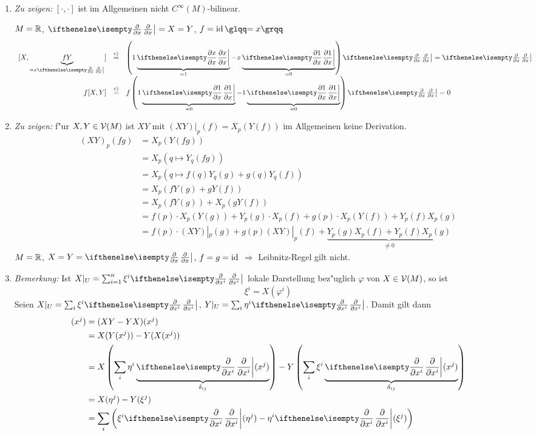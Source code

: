 \begin{Loes}\begin{enumerate}[label=\alph*),leftmargin=*,widest=a]
\item
	\emph{Zu zeigen:} $[\cdot,\cdot]$ ist im Allgemeinen nicht $C^{\infty}(M)$-bilinear.
	
	$M = \operatorname{\mathbb{R}}$, $\pdifffrac{}{x} = X = Y$, $f = \Id \quot{= x}$
		\[\begin{array}{rcl} [X,\underbrace{fY}_{=x \pdifffrac{}{x}}] &\overset{\text{c)}}{=}& \left( 1 \underbrace{\pdifffrac{x}{x}}_{=1} - x \underbrace{\pdifffrac{1}{x}}_{=0} \right) \pdifffrac{}{x} = \pdifffrac{}{x} \\
			f[X,Y] &\overset{\text{c)}}{=}& f \left( 1 \underbrace{\pdifffrac{1}{x}}_{=0} - 1 \underbrace{\pdifffrac{1}{x}}_{=0} \right) \pdifffrac{}{x} = 0 \end{array}\]
\item
	\emph{Zu zeigen:} f"ur $X, Y \in \operatorname{\mathcal{V}}(M)$ ist $XY$ mit $(XY)|_p(f) = X_p(Y(f))$ im Allgemeinen keine Derivation.
	\begin{align*}
		(XY)_p(fg) &= X_p(Y(fg))\\
		&= X_p(q \mapsto Y_q(fg))\\
		&= X_p(q \mapsto f(q) Y_q(g) + g(q) Y_q(f))\\
		&= X_p(fY(g) + gY(f))\\
		&= X_p(fY(g)) + X_p(gY(f))\\
		&= f(p) \cdot X_p(Y(g)) + Y_p(g) \cdot X_p(f) + g(p) \cdot X_p(Y(f)) + Y_p(f)X_p(g)\\
		&= f(p) \cdot (XY)|_p(g) + g(p)(XY)|_p(f) + \underbrace{Y_p(g)X_p(f) + Y_p(f)X_p(g)}_{\ne 0}
	\end{align*}
	$M = \operatorname{\mathbb{R}}$, $X = Y = \pdifffrac{}{x}$, $f = g = \operatorname{id}$ $\Rightarrow $ Leibnitz-Regel gilt nicht.
\item
	\emph{Bemerkung:} Ist $X|_U = \sum_{i=1}^{n}\xi^{i}\pdifffrac{}{x^{i}}$ lokale Darstellung bez"uglich $\varphi$ von $X \in \operatorname{\mathcal{V}}(M)$, so ist
		\[ \xi^{i} = X(\varphi^{i}) \]
	Seien $X|_U = \sum_i \xi^i \pdifffrac{}{x^{i}}$, $Y|_U = \sum_i \eta^{i} \pdifffrac{}{x^{i}}$. Damit gilt dann
	\begin{align*}
		[X,Y](x^j) &= (XY - YX)(x^j)\\
		&= X(Y(x^j)) - Y(X(x^j))\\
		&= X\left(\sum_i \eta^{i}\underbrace{\pdifffrac{}{x^{i}}(x^j)}_{\delta_{ij}}\right) - Y\left(\sum_i \xi^{i}\underbrace{\pdifffrac{}{x^{i}}(x^j)}_{\delta_{ij}}\right)\\
		&= X(\eta^j) - Y(\xi^j)\\
		&= \sum_i \left( \xi^{i} \pdifffrac{}{x^{i}}(\eta^j) - \eta^{i} \pdifffrac{}{x^{i}}(\xi^j) \right)
	\end{align*}
\end{enumerate}\end{Loes}

